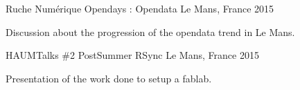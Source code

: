 \begin{cventries}
  \cventry
    {Ruche Numérique} %
    {Opendays : Opendata} %
    {Le Mans, France} %
    {2015} %
    {
      \begin{cvitems} %
			\item {Discussion about the progression of the opendata trend in Le Mans.}
      \end{cvitems}
    }

  \cventry
    {HAUMTalks \#2} %
    {PostSummer RSync} %
    {Le Mans, France} %
    {2015} %
    {
      \begin{cvitems} %
			\item {Presentation of the work done to setup a fablab.}
      \end{cvitems}
    }

\end{cventries}
